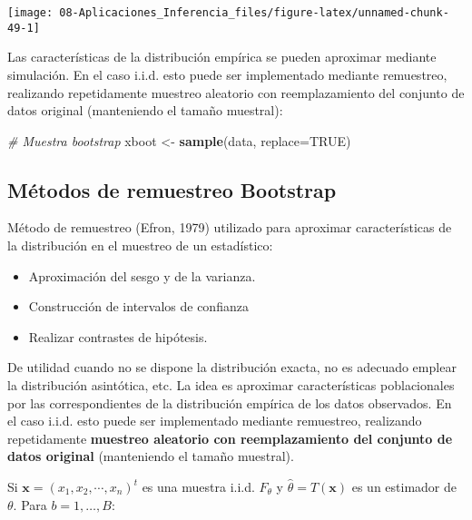 \documentclass[
]{book}
\newenvironment{Shaded}{\begin{snugshade}}{\end{snugshade}}
\newcommand{\CommentTok}[1]{\textcolor[rgb]{0.56,0.35,0.01}{\textit{#1}}}
\newcommand{\DataTypeTok}[1]{\textcolor[rgb]{0.13,0.29,0.53}{#1}}
\newcommand{\KeywordTok}[1]{\textcolor[rgb]{0.13,0.29,0.53}{\textbf{#1}}}
\newcommand{\NormalTok}[1]{#1}
\newcommand{\OtherTok}[1]{\textcolor[rgb]{0.56,0.35,0.01}{#1}}
\newcommand{\StringTok}[1]{\textcolor[rgb]{0.31,0.60,0.02}{#1}}
\theoremstyle{break}
\theoremstyle{definition}
\theoremstyle{definition}
\theoremstyle{definition}
\theoremstyle{remark}
\begin{document}
\begin{center}\texttt{[image: 08-Aplicaciones\_Inferencia\_files/figure-latex/unnamed-chunk-49-1]} \end{center}

Las características de la distribución empírica se pueden aproximar mediante simulación.
En el caso i.i.d. esto puede ser implementado mediante remuestreo,
realizando repetidamente muestreo aleatorio con reemplazamiento
del conjunto de datos original (manteniendo el tamaño muestral):

\begin{Shaded}
\begin{Highlighting}[]
 \CommentTok{# Muestra bootstrap}
\NormalTok{xboot <-}\StringTok{ }\KeywordTok{sample}\NormalTok{(data, }\DataTypeTok{replace=}\OtherTok{TRUE}\NormalTok{)}
\end{Highlighting}
\end{Shaded}

\hypertarget{muxe9todos-de-remuestreo-bootstrap}{%
\subsection{Métodos de remuestreo Bootstrap}\label{muxe9todos-de-remuestreo-bootstrap}}

Método de remuestreo (Efron, 1979) utilizado para aproximar
características de la distribución en el muestreo de un estadístico:

\begin{itemize}
\item
  Aproximación del sesgo y de la varianza.
\item
  Construcción de intervalos de confianza
\item
  Realizar contrastes de hipótesis.
\end{itemize}

De utilidad cuando no se dispone la distribución exacta, no es
adecuado emplear la distribución asintótica, etc.
La idea es aproximar características poblacionales por las
correspondientes de la distribución empírica de los
datos observados.
En el caso i.i.d. esto puede ser implementado mediante remuestreo,
realizando repetidamente \textbf{muestreo aleatorio con reemplazamiento
del conjunto de datos original} (manteniendo el tamaño muestral).

Si \(\mathbf{x} = \left( x_{1},x_{2},\cdots ,x_{n}\right) ^{t}\) es una
muestra i.i.d. \(F_{\theta }\) y
\(\hat{\theta} = T\left( \mathbf{x} \right)\)
es un estimador de \(\theta\).
Para \(b = 1,\ldots ,B:\)
\end{document}
